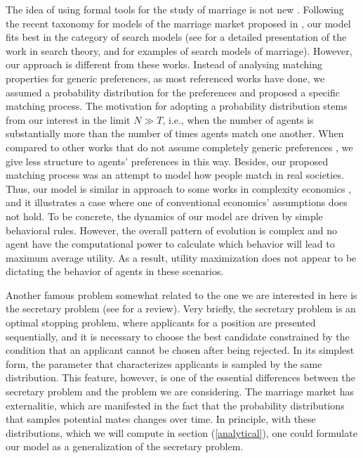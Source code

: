 \documentclass[12pt]{article}
\begin{document}
The idea of using formal tools for the study of marriage is not new \cite{10.2307/1831130,10.2307/1829987,10.2307/1837421}. Following the recent taxonomy for models of the marriage market proposed in \cite{doi:10.1146/annurev-economics-012320-121610}, our model fits best in the category of search models (see \cite{10.2307/23045893,10.1257/002205105775362014,doi:10.1146/annurev-economics-111809-125046,10.1257/jel.20150777} for a detailed presentation of the work in search theory, and  \cite{10.2307/2780247,10.2307/2951279,Burdett1999LongTermPF,10.2307/2999430,10.2307/44955185,RePEc:bpj:bejmac:v:advances.1:y:2001:i:1:n:5} for examples of search models of marriage). However, our approach is different from these works. Instead of analysing matching properties for generic preferences, as most referenced works have done, we assumed a probability distribution for the preferences and proposed a specific matching process. The motivation for adopting a probability distribution stems from our interest in the limit $N\gg T$, i.e., when the number of agents is substantially more than the number of times agents match one another. When compared to other works that do not assume completely generic preferences \cite{doi:10.1086/689869,10.1093/restud/rdw041}, we give less structure to agents' preferences in this way. Besides, our proposed matching process was an attempt to model how people match in real societies. Thus, our model is similar in approach to some works in complexity economics \cite{comecon,10.5555/547051}, and it illustrates a case where one of conventional economics' assumptions does not hold. To be concrete, the dynamics of our model are driven by simple behavioral rules. However, the overall pattern of evolution is complex and no agent have the computational power to calculate which behavior will lead to maximum average utility. As a result, utility maximization does not appear to be dictating the behavior of agents in these scenarios.

Another famous problem somewhat related to the one we are interested in here is the secretary problem (see \cite{10.2307/2245639} for a review). Very briefly, the secretary problem is an optimal stopping problem, where applicants for a position are presented sequentially, and it is necessary to choose the best candidate constrained by the condition that an applicant cannot be chosen after being rejected. In its simplest form, the parameter that characterizes applicants is sampled by the same distribution. This feature, however, is one of the essential differences between the secretary problem and the problem we are considering. The marriage market has externalitie, which are manifested in the fact that the probability distributions that samples potential mates changes over time. In principle, with these distributions, which we will compute in section (\ref{analytical}), one could formulate our model as a generalization of the secretary problem.
\end{document}
